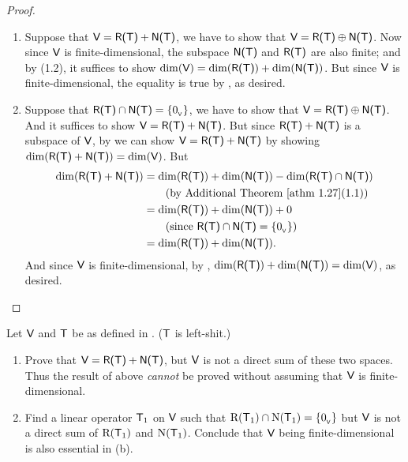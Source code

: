 \begin{proof} \ 
\begin{enumerate}
\item Suppose that \(\textsf{V} = \textsf{R(T)} + \textsf{N(T)}\), we have to show that \(\textsf{V} = \textsf{R(T)} \oplus \textsf{N(T)}\).
Now since \(\textsf{V}\) is finite-dimensional, the subspace \(\textsf{N(T)}\) and \(\textsf{R(T)}\) are also finite;
and by \ATHM{1.27}(1.2), it suffices to show \(\dim(\textsf{V}) = \dim(\textsf{R(T)}) + \dim(\textsf{N(T)})\).
But since \(\textsf{V}\) is finite-dimensional, the equality is true by \THM{2.3}, as desired.

\item Suppose that \(\textsf{R(T)} \cap \textsf{N(T)} = \{ 0_{_{\textsf{V}}} \}\), we have to show that \(\textsf{V} = \textsf{R(T)} \oplus \textsf{N(T)}\).
And it suffices to show \(\textsf{V} = \textsf{R(T)} + \textsf{N(T)}\).
But since \(\textsf{R(T)} + \textsf{N(T)}\) is a subspace of \(\textsf{V}\), by  we can show \(\textsf{V} = \textsf{R(T)} + \textsf{N(T)}\) by showing \(\dim(\textsf{R(T)} + \textsf{N(T)}) = \dim(\textsf{V})\).
But
\begin{align*}
    \dim(\RANGET + \NULLT) & = \dim(\RANGET) + \dim(\NULLT) - \dim(\RANGET \cap \NULLT) \\
                           & \text{\ \ \ \ \ \ (by \ATHM{1.27}(1.1))} \\
                           & = \dim(\RANGET) + \dim(\NULLT) + 0 \\
                           & \text{\ \ \ \ \ \ (since \(\RANGET \cap \NULLT = \{ \OV \}\))} \\
                           & = \dim(\RANGET) + \dim(\NULLT).
\end{align*}
And since \(\textsf{V}\) is finite-dimensional, by , \(\dim(\textsf{R(T)}) + \dim(\textsf{N(T)}) = \dim(\textsf{V})\), as desired.
\end{enumerate}
\end{proof}

\begin{exercise} \label{exercise 2.1.37}
Let \(\textsf{V}\) and \(\textsf{T}\) be as defined in .
(\(\textsf{T}\) is left-shit.)
\begin{enumerate}
\item Prove that \(\textsf{V} = \textsf{R(T)} + \textsf{N(T)}\), but \(\textsf{V}\) is not a direct sum of these two spaces.
    Thus the result of \EXEC{2.1.36} above \emph{cannot} be proved without assuming that \(\textsf{V}\) is finite-dimensional.
\item Find a linear operator \(\textsf{T}_1\) on \(\textsf{V}\) such that \(\mathrm{R}(\textsf{T}_1) \cap \mathrm{N}(\textsf{T}_1) = \{ 0_{_{\textsf{V}}} \}\) but \(\textsf{V}\) is not a direct sum of \(\mathrm{R}(\textsf{T}_1)\) and \(\mathrm{N}(\textsf{T}_1)\).
    Conclude that \(\textsf{V}\) being finite-dimensional is also essential in \EXEC{2.1.36}(b).
\end{enumerate}
\end{exercise}

